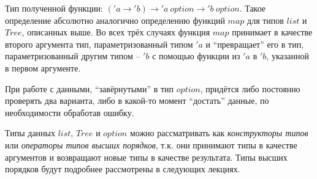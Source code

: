 \documentclass[a4paper,11pt]{article}
\begin{document}
Тип полученной функции: $('a \rightarrow 'b) \rightarrow 'a~option \rightarrow 
'b~option$. Такое определение абсолютно аналогично определению функций $map$ для 
типов $list$ и $Tree$, описанных выше. Во всех трёх случаях функция $map$
принимает в качестве второго аргумента тип, параметризованный типом $'a$ и
``превращает'' его в тип, параметризованный другим типом -- $'b$ с помощью
функции из $'a$ в $'b$, указанной в первом аргументе.

При работе с данными, ``завёрнутыми'' в тип $option$, придётся либо постоянно
проверять два варианта, либо в какой-то момент ``достать'' данные, по
необходимости обработав ошибку. 

Типы данных $list$, $Tree$ и $option$ можно рассматривать как \emph{конструкторы 
типов} или \emph{операторы типов высших порядков}, т.к. они принимают типы в
качестве аргументов и возвращают новые типы в качестве результата. Типы высших
порядков будут подробнее рассмотрены в следующих лекциях.
\nocite{*}


\end{document}
